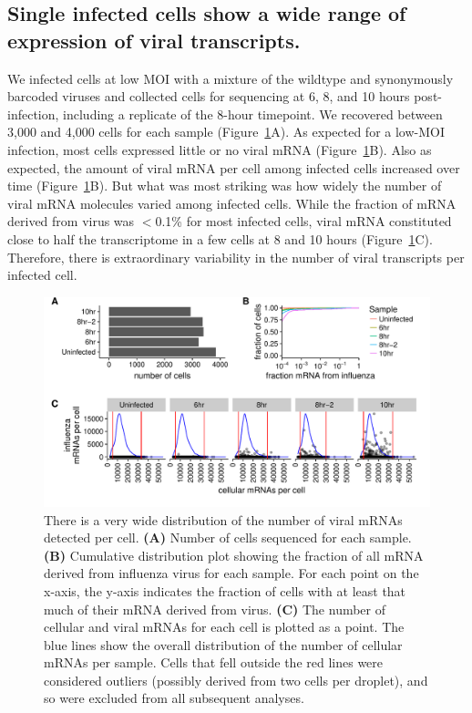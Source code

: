 \documentclass[9pt,lineno]{elife}
\begin{document}
\subsection{Single infected cells show a wide range of expression of viral transcripts.}
We infected cells at low MOI with a mixture of the wildtype and synonymously barcoded viruses and collected cells for sequencing at 6, 8, and 10 hours post-infection, including a replicate of the 8-hour timepoint.
We recovered between 3,000 and 4,000 cells for each sample (Figure~\ref{fig:cells}A). 
As expected for a low-MOI infection, most cells expressed little or no viral mRNA (Figure~\ref{fig:cells}B).
Also as expected, the amount of viral mRNA per cell among infected cells increased over time (Figure~\ref{fig:cells}B).
But what was most striking was how widely the number of viral mRNA molecules varied among infected cells.
While the fraction of mRNA derived from virus was $<$0.1\% for most infected cells, viral mRNA constituted close to half the transcriptome in a few cells at 8 and 10 hours (Figure~\ref{fig:cells}C).
Therefore, there is extraordinary variability in the number of viral transcripts per infected cell.

\begin{figure}
\includegraphics[width=\linewidth]{figures/p_cell_mRNA_summary.pdf}
\caption{\label{fig:cells}
There is a very wide distribution of the number of viral mRNAs detected per cell.
{\bf (A)} 
Number of cells sequenced for each sample.
{\bf (B)} 
Cumulative distribution plot showing the fraction of all mRNA derived from influenza virus for each sample.
For each point on the x-axis, the y-axis indicates the fraction of cells with at least that much of their mRNA derived from virus.
{\bf (C)} 
The number of cellular and viral mRNAs for each cell is plotted as a point.
The blue lines show the overall distribution of the number of cellular mRNAs per sample.
Cells that fell outside the red lines were considered outliers (possibly derived from two cells per droplet), and so were excluded from all subsequent analyses.
}
\end{figure}
\end{document}
